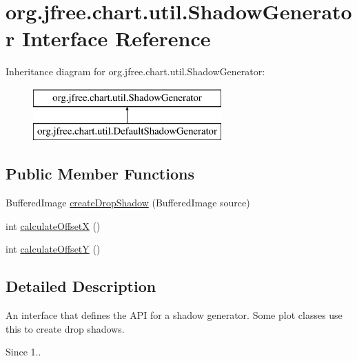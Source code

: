 \hypertarget{interfaceorg_1_1jfree_1_1chart_1_1util_1_1_shadow_generator}{}\section{org.\+jfree.\+chart.\+util.\+Shadow\+Generator Interface Reference}
\label{interfaceorg_1_1jfree_1_1chart_1_1util_1_1_shadow_generator}
Inheritance diagram for org.\+jfree.\+chart.\+util.\+Shadow\+Generator\+:\begin{figure}[H]
\begin{center}
\leavevmode
\includegraphics[height=2.000000cm]{interfaceorg_1_1jfree_1_1chart_1_1util_1_1_shadow_generator}
\end{center}
\end{figure}
\subsection*{Public Member Functions}
\begin{DoxyCompactItemize}
\item 
Buffered\+Image \mbox{\hyperlink{interfaceorg_1_1jfree_1_1chart_1_1util_1_1_shadow_generator_a8771623b832045a88620c5c5965d82eb}{create\+Drop\+Shadow}} (Buffered\+Image source)
\item 
int \mbox{\hyperlink{interfaceorg_1_1jfree_1_1chart_1_1util_1_1_shadow_generator_a8a4a3d5012c0aa1d45ddb68e390f7968}{calculate\+OffsetX}} ()
\item 
int \mbox{\hyperlink{interfaceorg_1_1jfree_1_1chart_1_1util_1_1_shadow_generator_a86796160b6e9262408d7848d8ddaff0f}{calculate\+OffsetY}} ()
\end{DoxyCompactItemize}


\subsection{Detailed Description}
An interface that defines the A\+PI for a shadow generator. Some plot classes use this to create drop shadows.

\begin{DoxySince}{Since}
1.. 
\end{DoxySince}


